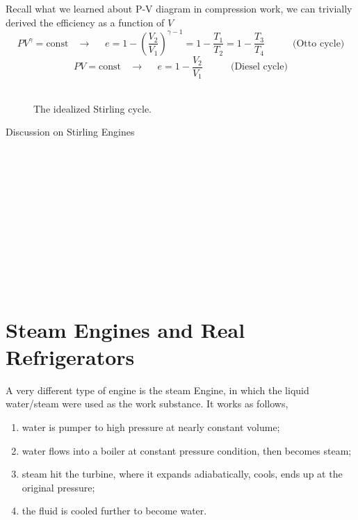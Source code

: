 Recall what we learned about P-V diagram in compression work, we can trivially derived the efficiency as a function of $V$
\begin{equation}
PV^{\gamma} = \text{const} ~~~~\rightarrow~~~~~~ e = 1-(\frac{V_2}{V_1})^{\gamma-1} 
                                                   = 1-\frac{T_1}{T_2} 
                                                   = 1-\frac{T_3}{T_4}~~~~~~~~~~~~~ \text{(Otto cycle)}
\end{equation}
\begin{equation}
PV = \text{const} ~~~~\rightarrow~~~~~~ e = 1-\frac{V_2}{V_1}  ~~~~~~~~~~~~~ \text{(Diesel cycle)}
\end{equation}
\\
\begin{figure}[ht]
\centering
{}
\caption{The idealized Stirling cycle.}
\end{figure}



Discussion on Stirling Engines
\\\\\\\\\\\\\\\\\\\\\\\\
\section{Steam Engines and Real Refrigerators}
A very different type of engine is the steam Engine, in which the liquid water/steam were used as the work substance.
It works as follows,
\begin{enumerate}
\item water is pumper to high pressure at nearly constant volume;
\item water flows into a boiler at constant pressure condition, then becomes steam;
\item steam hit the turbine, where it expands adiabatically, cools, ends up at the original pressure;
\item the fluid is cooled further to become water.
\end{enumerate}


